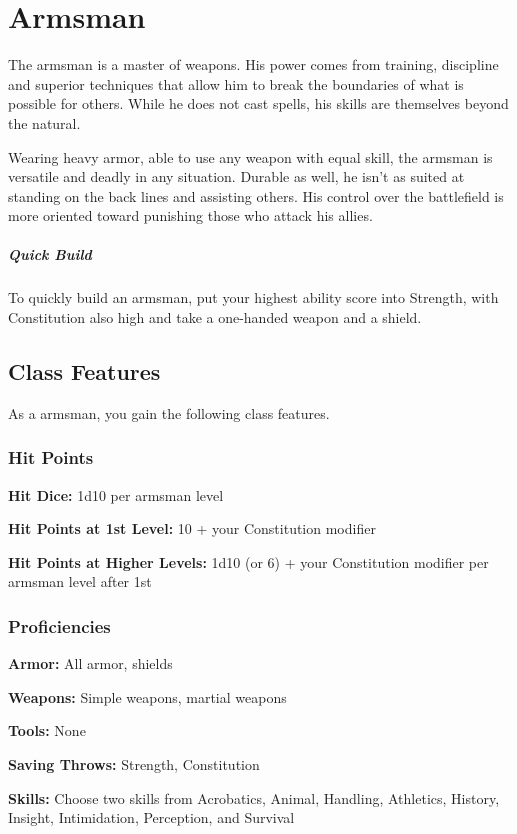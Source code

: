 \section{Armsman\label{class:armsman}}

The armsman is a master of weapons. His power comes from training, discipline and superior techniques that allow him to break the boundaries of what is possible for others. While he does not cast spells, his skills are themselves beyond the natural.

Wearing heavy armor, able to use any weapon with equal skill, the armsman is versatile and deadly in any situation. Durable as well, he isn't as suited at standing on the back lines and assisting others. His control over the battlefield is more oriented toward punishing those who attack his allies.

\subparagraph*{Quick Build}
To quickly build an armsman, put your highest ability score into Strength, with Constitution also high and take a one-handed weapon and a shield.

\subsection{Class Features}

As a armsman, you gain the following class features.

\subsubsection{Hit Points}

\textbf{Hit Dice:} 1d10 per armsman level

\textbf{Hit Points at 1st Level:} 10 + your Constitution modifier

\textbf{Hit Points at Higher Levels:} 1d10 (or 6) + your Constitution modifier per armsman level after 1st

\subsubsection{Proficiencies}

\textbf{Armor:} All armor, shields

\textbf{Weapons:} Simple weapons, martial weapons

\textbf{Tools:} None

\textbf{Saving Throws:} Strength, Constitution

\textbf{Skills:} Choose two skills from Acrobatics, Animal, Handling, Athletics, History, Insight, Intimidation, Perception, and Survival

